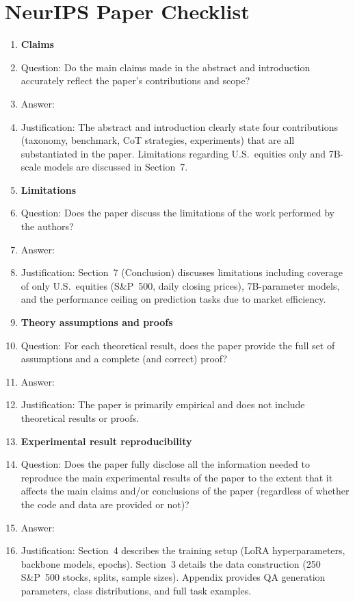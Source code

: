 \section*{NeurIPS Paper Checklist}

\begin{enumerate}

\item {\bf Claims}
    \item[] Question: Do the main claims made in the abstract and introduction accurately reflect the paper's contributions and scope?
    \item[] Answer: \answerYes{}
    \item[] Justification: The abstract and introduction clearly state four contributions (taxonomy, benchmark, CoT strategies, experiments) that are all substantiated in the paper. Limitations regarding U.S.\ equities only and 7B-scale models are discussed in Section~7.

\item {\bf Limitations}
    \item[] Question: Does the paper discuss the limitations of the work performed by the authors?
    \item[] Answer: \answerYes{}
    \item[] Justification: Section~7 (Conclusion) discusses limitations including coverage of only U.S.\ equities (S\&P~500, daily closing prices), 7B-parameter models, and the performance ceiling on prediction tasks due to market efficiency.

\item {\bf Theory assumptions and proofs}
    \item[] Question: For each theoretical result, does the paper provide the full set of assumptions and a complete (and correct) proof?
    \item[] Answer: \answerNA{}
    \item[] Justification: The paper is primarily empirical and does not include theoretical results or proofs.

    \item {\bf Experimental result reproducibility}
    \item[] Question: Does the paper fully disclose all the information needed to reproduce the main experimental results of the paper to the extent that it affects the main claims and/or conclusions of the paper (regardless of whether the code and data are provided or not)?
    \item[] Answer: \answerYes{}
    \item[] Justification: Section~4 describes the training setup (LoRA hyperparameters, backbone models, epochs). Section~3 details the data construction (250 S\&P~500 stocks, splits, sample sizes). Appendix provides QA generation parameters, class distributions, and full task examples.


\end{enumerate}
